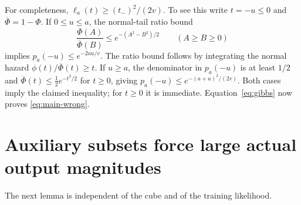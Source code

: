 \documentclass[11pt]{article}
\theoremstyle{remark}\newtheorem{remark}[theorem]{Remark}
\begin{document}
For completeness, $\ell_a(t)\ge(t_-)^2/(2v)$. To see this write $t=-u\le0$ and $\overline\Phi=1-\Phi$. If $0\le u\le a$, the normal-tail ratio bound
\[
 \frac{\overline\Phi(A)}{\overline\Phi(B)}\le e^{-(A^2-B^2)/2}\qquad(A\ge B\ge0)
\]
implies $p_a(-u)\le e^{-2au/v}$. The ratio bound follows by integrating the normal hazard $\phi(t)/\overline\Phi(t)\ge t$. If $u\ge a$, the denominator in $p_a(-u)$ is at least $1/2$ and $\overline\Phi(t)\le\tfrac12e^{-t^2/2}$ for $t\ge0$, giving $p_a(-u)\le e^{-(a+u)^2/(2v)}$. Both cases imply the claimed inequality; for $t\ge0$ it is immediate. Equation~\eqref{eq:gibbs} now proves \eqref{eq:main-wrong}.

\section{Auxiliary subsets force large actual output magnitudes}
The next lemma is independent of the cube and of the training likelihood.
\end{document}
